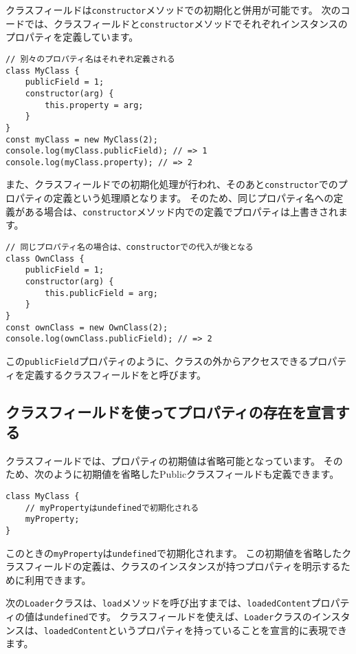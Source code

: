 クラスフィールドは\texttt{constructor}メソッドでの初期化と併用が可能です。
次のコードでは、クラスフィールドと\texttt{constructor}メソッドでそれぞれインスタンスのプロパティを定義しています。

\begin{lstlisting}
// 別々のプロパティ名はそれぞれ定義される
class MyClass {
    publicField = 1;
    constructor(arg) {
        this.property = arg;
    }
}
const myClass = new MyClass(2);
console.log(myClass.publicField); // => 1
console.log(myClass.property); // => 2
\end{lstlisting}

また、クラスフィールドでの初期化処理が行われ、そのあと\texttt{constructor}でのプロパティの定義という処理順となります。
そのため、同じプロパティ名への定義がある場合は、\texttt{constructor}メソッド内での定義でプロパティは上書きされます。

\begin{lstlisting}
// 同じプロパティ名の場合は、constructorでの代入が後となる
class OwnClass {
    publicField = 1;
    constructor(arg) {
        this.publicField = arg;
    }
}
const ownClass = new OwnClass(2);
console.log(ownClass.publicField); // => 2
\end{lstlisting}

この\texttt{publicField}プロパティのように、クラスの外からアクセスできるプロパティを定義するクラスフィールドを\textbf{}と呼びます。

\hypertarget{declare-class-fields}{%
\subsection{クラスフィールドを使ってプロパティの存在を宣言する}\label{declare-class-fields}}

クラスフィールドでは、プロパティの初期値は省略可能となっています。
そのため、次のように初期値を省略したPublicクラスフィールドも定義できます。

\begin{lstlisting}
class MyClass {
    // myPropertyはundefinedで初期化される
    myProperty;
}
\end{lstlisting}

このときの\texttt{myProperty}は\texttt{undefined}で初期化されます。
この初期値を省略したクラスフィールドの定義は、クラスのインスタンスが持つプロパティを明示するために利用できます。

次の\texttt{Loader}クラスは、\texttt{load}メソッドを呼び出すまでは、\texttt{loadedContent}プロパティの値は\texttt{undefined}です。
クラスフィールドを使えば、\texttt{Loader}クラスのインスタンスは、\texttt{loadedContent}というプロパティを持っていることを宣言的に表現できます。

